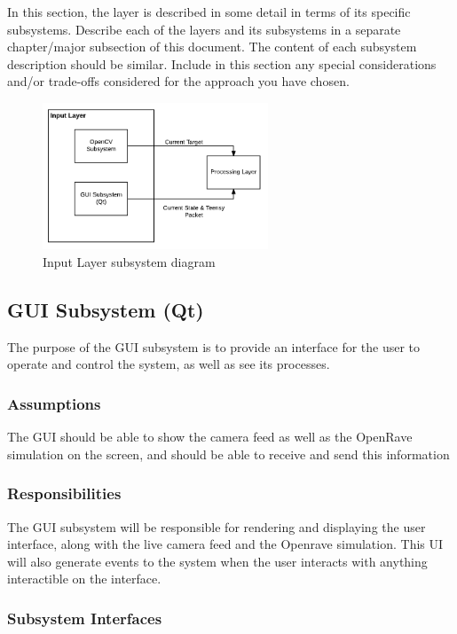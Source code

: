 In this section, the layer is described in some detail in terms of its specific subsystems. Describe each of the layers and its subsystems in a separate chapter/major subsection of this document. The content of each subsystem description should be similar. Include in this section any special considerations and/or trade-offs considered for the approach you have chosen.

\begin{figure}[h!]
	\centering
 	\includegraphics[width=0.60\textwidth]{images/input}
 \caption{Input Layer subsystem diagram}
\end{figure}

\subsection{GUI Subsystem (Qt)}
The purpose of the GUI subsystem is to provide an interface for the user to operate and control the system, as well as see its processes.

\subsubsection{Assumptions}
The GUI should be able to show the camera feed as well as the OpenRave simulation on the screen, and should be able to receive and send this information

\subsubsection{Responsibilities}
The GUI subsystem will be responsible for rendering and displaying the user interface, along with the live camera feed and the Openrave simulation. This UI will also generate events to the system when the user interacts with anything interactible on the interface.

\subsubsection{Subsystem Interfaces}


